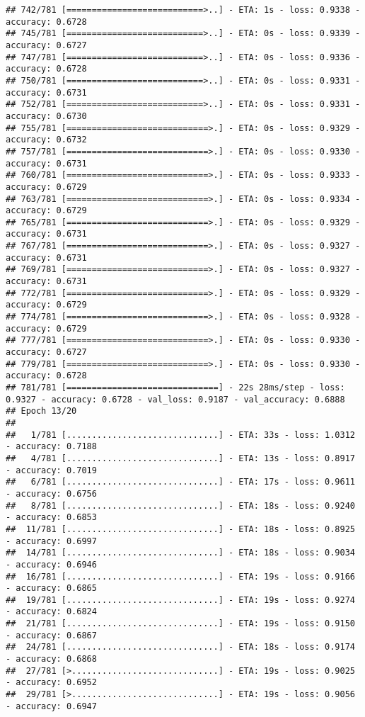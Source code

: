 \documentclass[
]{article}
\begin{document}
\begin{verbatim}
## 742/781 [===========================>..] - ETA: 1s - loss: 0.9338 - accuracy: 0.6728
## 745/781 [===========================>..] - ETA: 0s - loss: 0.9339 - accuracy: 0.6727
## 747/781 [===========================>..] - ETA: 0s - loss: 0.9336 - accuracy: 0.6728
## 750/781 [===========================>..] - ETA: 0s - loss: 0.9331 - accuracy: 0.6731
## 752/781 [===========================>..] - ETA: 0s - loss: 0.9331 - accuracy: 0.6730
## 755/781 [============================>.] - ETA: 0s - loss: 0.9329 - accuracy: 0.6732
## 757/781 [============================>.] - ETA: 0s - loss: 0.9330 - accuracy: 0.6731
## 760/781 [============================>.] - ETA: 0s - loss: 0.9333 - accuracy: 0.6729
## 763/781 [============================>.] - ETA: 0s - loss: 0.9334 - accuracy: 0.6729
## 765/781 [============================>.] - ETA: 0s - loss: 0.9329 - accuracy: 0.6731
## 767/781 [============================>.] - ETA: 0s - loss: 0.9327 - accuracy: 0.6731
## 769/781 [============================>.] - ETA: 0s - loss: 0.9327 - accuracy: 0.6731
## 772/781 [============================>.] - ETA: 0s - loss: 0.9329 - accuracy: 0.6729
## 774/781 [============================>.] - ETA: 0s - loss: 0.9328 - accuracy: 0.6729
## 777/781 [============================>.] - ETA: 0s - loss: 0.9330 - accuracy: 0.6727
## 779/781 [============================>.] - ETA: 0s - loss: 0.9330 - accuracy: 0.6728
## 781/781 [==============================] - 22s 28ms/step - loss: 0.9327 - accuracy: 0.6728 - val_loss: 0.9187 - val_accuracy: 0.6888
## Epoch 13/20
## 
##   1/781 [..............................] - ETA: 33s - loss: 1.0312 - accuracy: 0.7188
##   4/781 [..............................] - ETA: 13s - loss: 0.8917 - accuracy: 0.7019
##   6/781 [..............................] - ETA: 17s - loss: 0.9611 - accuracy: 0.6756
##   8/781 [..............................] - ETA: 18s - loss: 0.9240 - accuracy: 0.6853
##  11/781 [..............................] - ETA: 18s - loss: 0.8925 - accuracy: 0.6997
##  14/781 [..............................] - ETA: 18s - loss: 0.9034 - accuracy: 0.6946
##  16/781 [..............................] - ETA: 19s - loss: 0.9166 - accuracy: 0.6865
##  19/781 [..............................] - ETA: 19s - loss: 0.9274 - accuracy: 0.6824
##  21/781 [..............................] - ETA: 19s - loss: 0.9150 - accuracy: 0.6867
##  24/781 [..............................] - ETA: 18s - loss: 0.9174 - accuracy: 0.6868
##  27/781 [>.............................] - ETA: 19s - loss: 0.9025 - accuracy: 0.6952
##  29/781 [>.............................] - ETA: 19s - loss: 0.9056 - accuracy: 0.6947

\end{verbatim}
\end{document}

